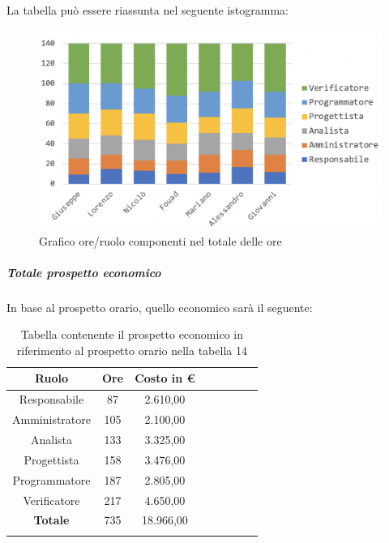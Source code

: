 			La tabella può essere riassunta nel seguente istogramma:
			\begin{figure}[H]
				\centering
				\includegraphics[width=0.8\linewidth]{./images/preventivo/totOre1.png}
				\caption{Grafico ore/ruolo componenti nel totale delle ore}
				\label{fig:grafico suddivione ruoli totale ore}
			\end{figure}
			
			\subparagraph{Totale prospetto economico}
			In base al prospetto orario, quello economico sarà il seguente: 
			
			\begin{longtable}{|c|c|c|c|c|c|c|c|}
				\hline
				\rowcolor{lighter-grayer}
				\textbf{Ruolo} & \textbf{Ore} & \textbf{Costo in € } \\
				\hline
				\endfirsthead
				
				\hline
				Responsabile 	    & 87 & 2.610,00\\
				\hline 
				\hline
				Amministratore	  & 105 & 2.100,00\\
				\hline
				\hline
				Analista 				& 133 & 3.325,00\\
				\hline
				\hline
				Progettista 		  & 158 & 3.476,00\\
				\hline
				\hline
				Programmatore 	 & 187 & 2.805,00\\
				\hline
				\hline
				Verificatore 		  & 217 & 4.650,00\\
				\hline
				\textbf{Totale} 	& 735 & 18.966,00\\
				\hline
				\caption{Tabella contenente il prospetto economico in riferimento al prospetto orario nella tabella 14}
			\end{longtable}
			\pagebreak
			
